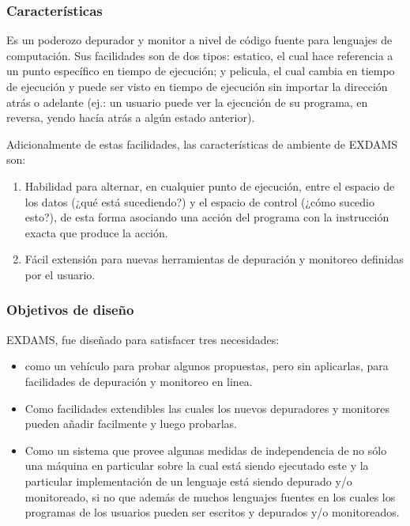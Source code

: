 \documentclass[12pt,legalpaper]{report}
\begin{document}
			\subsubsection{Características}

Es un poderozo depurador y monitor a nivel de código fuente para lenguajes de computación.  Sus facilidades son de dos tipos: estatico, el cual hace referencia a un punto específico en tiempo de ejecución; y pelicula, el cual cambia en tiempo de ejecución y puede ser visto en tiempo de ejecución sin importar la dirección atrás o adelante (ej.: un usuario puede ver la ejecución de su programa, en reversa, yendo hacía atrás a algún estado anterior).

Adicionalmente de estas facilidades, las características de ambiente de EXDAMS son:
\begin{enumerate}
	\item Habilidad para alternar, en cualquier punto de ejecución, entre el espacio de los datos (¿qué está sucediendo?) y el espacio de control (¿cómo sucedio esto?), de esta forma asociando una acción del programa con la instrucción exacta que produce la acción.

	\item Fácil extensión para nuevas herramientas de depuración y monitoreo definidas por el usuario.
\end{enumerate} 

			\subsubsection{Objetivos de diseño}

EXDAMS, fue diseñado para satisfacer tres necesidades:
\begin{itemize}
	\item como un vehículo para probar algunos propuestas, pero sin aplicarlas, para facilidades de depuración y monitoreo en linea.

	\item Como facilidades extendibles las cuales los nuevos depuradores y monitores pueden añadir facilmente y luego probarlas.

	\item Como un sistema que provee algunas medidas de independencia de no sólo una máquina en particular sobre la cual está siendo ejecutado este y la particular implementación de un lenguaje está siendo depurado y/o monitoreado, si no que además de muchos lenguajes fuentes en los cuales los programas de los usuarios pueden ser escritos y depurados y/o monitoreados.
\end{itemize}
\end{document}

